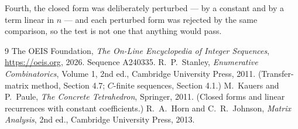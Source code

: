 \documentclass[11pt,a4paper]{article}
\theoremstyle{plain}
\theoremstyle{definition}
\begin{document}
Fourth, the closed form was deliberately perturbed --- by a constant and by a term linear in
$n$ --- and each perturbed form was rejected by the same comparison, so the test is not one
that anything would pass.

\begin{thebibliography}{9}
 The OEIS Foundation, \emph{The On-Line Encyclopedia of Integer
Sequences}, \url{https://oeis.org}, 2026. Sequence A240335.
 R.~P.~Stanley, \emph{Enumerative Combinatorics}, Volume 1, 2nd ed.,
Cambridge University Press, 2011. (Transfer-matrix method, Section 4.7; $C$-finite sequences,
Section 4.1.)
 M.~Kauers and P.~Paule, \emph{The Concrete Tetrahedron}, Springer, 2011.
(Closed forms and linear recurrences with constant coefficients.)
 R.~A.~Horn and C.~R.~Johnson, \emph{Matrix Analysis}, 2nd ed., Cambridge
University Press, 2013.
\end{thebibliography}
\end{document}
